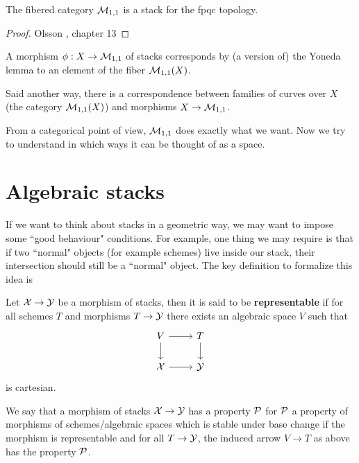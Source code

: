 \begin{theorem}
The fibered category $\mathcal{M}_{1,1}$ is a stack for the fpqc topology.
\end{theorem}
\begin{proof}
Olsson \cite{olsson2016algebraic}, chapter 13
\end{proof}

\begin{remark}
A morphism $\phi :X\to\mathcal{M}_{1,1}$ of stacks corresponds by (a version of) the Yoneda lemma to an element of the fiber $\mathcal{M}_{1,1}(X)$.
\bigskip

\noindent Said another way, there is a correspondence between families of curves over $X$ (the category $\mathcal{M}_{1,1}(X)$) and morphisms $X\to \mathcal{M}_{1,1}$.
\end{remark}

From a categorical point of view, $\mathcal{M}_{1,1}$ does exactly what we want. Now we try to understand in which ways it can be thought of as a space.


\section{Algebraic stacks}
If we want to think about stacks in a geometric way, we may want to impose some ``good behaviour" conditions. For example, one thing we may require is that if two ``normal" objects (for example schemes) live inside our stack, their intersection should still be a ``normal" object. The key definition to formalize this idea is
\begin{definition}
Let $\mathcal{X}\to \mathcal{Y}$ be a morphism of stacks, then it is said to be \textbf{representable} if for all schemes $T$ and morphisms $T\to \mathcal{Y}$ there exists an algebraic space $V$ such that
\[\begin{tikzcd}
	V & T \\
	\Xc & \Yc
	\arrow[from=1-1, to=1-2]
	\arrow[from=1-1, to=2-1]
	\arrow[from=1-2, to=2-2]
	\arrow[from=2-1, to=2-2]
\end{tikzcd}\]
is cartesian.

We say that a morphism of stacks $\mathcal{X}\to \mathcal{Y}$ has a property $\mathcal{P}$ for $\mathcal{P}$ a property of morphisms of schemes/algebraic spaces which is stable under base change if the morphism is representable and for all $T\to\mathcal{Y}$, the induced arrow $V\to T$ as above has the property $\mathcal{P}$.
\end{definition}

